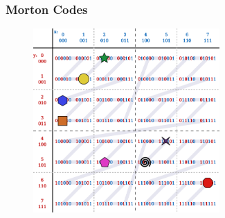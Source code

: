 \documentclass{beamer}
\begin{document}
%
%


\begin{frame}
  \frametitle{Morton Codes}
\begin{figure}
\includegraphics[height=70mm]{Z-curve-primitives.png}
\end{figure}
\end{frame}
\end{document}
